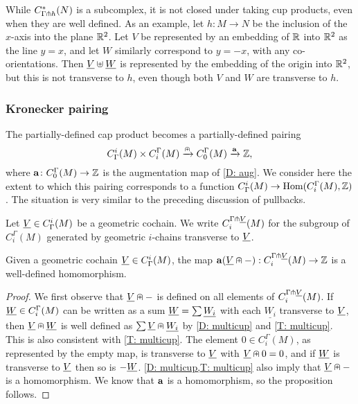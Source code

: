 \begin{remark}
	While $C^*_{\Gamma \pitchfork h}(N)$ is a subcomplex, it is not closed under taking cup products, even when they are well defined.
	As an example, let $h \colon M \to N$ be the inclusion of the $x$-axis into the plane $\mathbb{R}^2$.
	Let $V$ be represented by an embedding of $\mathbb{R}$ into $\mathbb{R}^2$ as the line $y = x$, and let $W$ similarly correspond to $y = -x$, with any co-orientations.
	Then $\underline{V} \uplus \underline{W}$ is represented by the embedding of the origin into $\mathbb{R}^2$, but this is not transverse to $h$, even though both $V$ and $W$ are transverse to $h$.
\end{remark}

\subsubsection{Kronecker pairing}

The partially-defined cap product becomes a partially-defined pairing
$$C^i_\Gamma(M) \times C_i^\Gamma(M) \xrightarrow{\nplus} C_0^\Gamma(M) \xrightarrow{\mathbf{a}}\mathbb{Z},$$
where $\mathbf{a} \colon C_0^\Gamma(M) \to \mathbb{Z}$ is the augmentation map of \cref{D: aug}.
We consider here the extent to which this pairing corresponds to a function $C^i_\Gamma(M) \to \textup{Hom}(C_i^\Gamma(M),\mathbb{Z})$.
The situation is very similar to the preceding discussion of pullbacks.

\begin{definition}\label{D: transverse to cohain}
	Let $\underline{V} \in C^i_\Gamma(M)$ be a geometric cochain.
	We write $C_i^{\Gamma \pitchfork \underline{V}}(M)$ for the subgroup of $C_i^\Gamma(M)$ generated by geometric $i$-chains transverse to $\underline{V}$.
\end{definition}

\begin{proposition}
	Given a geometric cochain $\underline{V} \in C^i_\Gamma(M)$, the map $\mathbf{a}(\underline{V}\nplus -):C_i^{\Gamma \pitchfork \underline{V}}(M) \to \mathbb{Z}$ is a well-defined homomorphism.
\end{proposition}

\begin{proof}
	We first observe that $\underline{V}\nplus -$ is defined on all elements of $C_i^{\Gamma \pitchfork \underline{V}}(M)$.
	If $\underline{W} \in C_i^\Gamma(M)$ can be written as a sum $\underline{W} = \sum \underline{W_i}$ with each $\underline{W_i}$ transverse to $\underline{V}$, then $\underline{V}\nplus \underline{W}$ is well defined as $\sum \underline{V}\nplus \underline{W_i}$ by \cref{D: multicup} and \cref{T: multicup}.
	This is also consistent with \cref{T: multicup}.
	The element $0 \in C_i^\Gamma(M)$, as represented by the empty map, is transverse to $\underline{V}$ with $\underline{V}\nplus 0 = 0$, and if $\underline{W}$ is transverse to $\underline{V}$ then so is $-\underline{W}$.
	\cref{D: multicup,T: multicup} also imply that $\underline{V} \nplus -$ is a homomorphism.
	We know that $\mathbf{a}$ is a homomorphism, so the proposition follows.
\end{proof}

